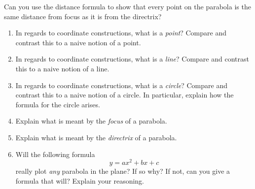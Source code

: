 \begin{question} 
Can you use the distance formula to show that every point on the
parabola is the same distance from focus as it is from the directrix?
\end{question}
\QM




\begin{problems}
\begin{enumerate}
\item In regards to coordinate constructions, what is a
  \textit{point}?  Compare and contrast this to a naive notion of a
  point.
\item In regards to coordinate constructions, what is a \textit{line}?
  Compare and contrast this to a naive notion of a line.
\item In regards to coordinate constructions, what is a
  \textit{circle}?  Compare and contrast this to a naive notion of a
  circle. In particular, explain how the formula for the circle
  arises.
\item Explain what is meant by the \textit{focus} of a parabola.
\item Explain what is meant by the \textit{directrix} of a parabola.
\item Will the following formula
\[
y = ax^2 + bx + c
\]
really plot \textit{any} parabola in the plane? If so why? If not, can you give
a formula that will? Explain your reasoning.


\end{enumerate}
\end{problems}
